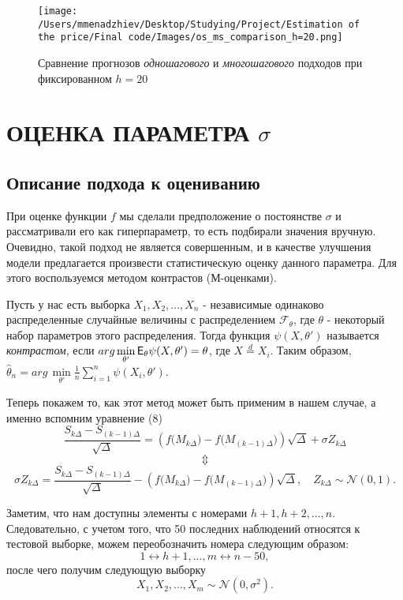 \begin{figure}[H]
    \centering
    \texttt{[image: /Users/mmenadzhiev/Desktop/Studying/Project/Estimation of the price/Final code/Images/os\_ms\_comparison\_h=20.png]}
    \caption{Сравнение прогнозов \textit{одношагового} и \textit{многошагового} подходов при фиксированном $h = 20$}
\end{figure}

\section{ОЦЕНКА ПАРАМЕТРА $\sigma$}

\subsection{Описание подхода к оцениванию}

При оценке функции $f$ мы сделали предположение о постоянстве $\sigma$ и рассматривали его как гиперпараметр, то есть подбирали значения вручную. Очевидно, такой подход не является совершенным, и в качестве улучшения модели предлагается произвести статистическую оценку данного параметра. Для этого воспользуемся методом контрастов (М-оценками).

Пусть у нас есть выборка $X_1, X_2, ... , X_n$ - независимые одинаково распределенные случайные величины с распределением $\mathcal F_{\theta}$, где $\theta$ - некоторый набор параметров этого распределения. Тогда функция $\psi(X, \theta')$ называется \textit{контрастом}, если $arg \, \underset{\theta'}{\min} \, \textsf E_{\theta} \psi(X, \theta') = \theta$, где $X \overset{d}{=} X_i$. Таким образом, $\hat{\theta}_n =  arg \, \underset{\theta'}{\min} \frac 1n \sum\limits_{i=1}^n \psi(X_i, \theta')$.

Теперь покажем то, как этот метод может быть применим в нашем случае, а именно вспомним уравнение (8)
\[
\frac{ S_{k \Delta} - S_{(k - 1) \Delta}}{\sqrt{\Delta}} = \left( f \big( M_{k \Delta} \big) - f \big( M_{(k - 1) \Delta} \big) \right) \sqrt{\Delta} +  \sigma Z_{k \Delta}
\]
\[
\Updownarrow
\]
\[
\sigma Z_{k \Delta} = \frac{ S_{k \Delta} - S_{(k - 1) \Delta}}{\sqrt{\Delta}} -  \left( f \big( M_{k \Delta} \big) - f \big( M_{(k - 1) \Delta} \big) \right) \sqrt{\Delta}, \quad Z_{k \Delta} \sim \mathcal N (0, 1).
\]

Заметим, что нам доступны элементы с номерами $h + 1, h + 2, ..., n$. Следовательно, с учетом того, что 50 последних наблюдений относятся к тестовой выборке, можем переобозначить номера следующим образом:
\[
1 \leftrightarrow h + 1, ... , m \leftrightarrow n - 50,
\]
после чего получим следующую выборку
\[
X_1, X_2, ..., X_m \sim \mathcal N(0, \sigma^2).
\]

